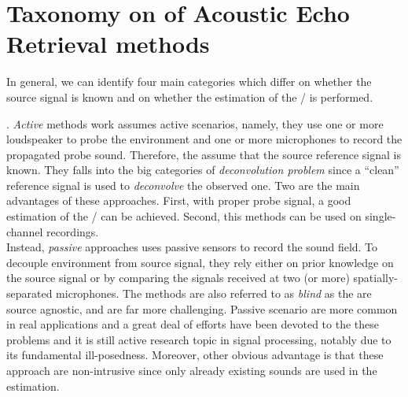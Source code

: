 \section{Taxonomy on of Acoustic Echo Retrieval methods}\label{sec:estimation:taxonomy}

In general, we can identify four main categories which differ on whether the source signal is known and on whether the estimation of the \RIR/ is performed.

.
\textit{Active} methods work assumes active scenarios, namely, they use one or more loudspeaker to probe the environment and one or more microphones to record the propagated probe sound.
Therefore, the assume that the source reference signal is known.
They falls into the big categories of \textit{deconvolution problem} since a ``clean'' reference signal is used to \textit{deconvolve} the observed one.
Two are the main advantages of these approaches.
First, with proper probe signal, a good estimation of the \RIR/ can be achieved.
Second, this methods can be used on single-channel recordings.
\\Instead, \textit{passive} approaches uses passive sensors to record the sound field.
To decouple environment from source signal, they rely either on prior knowledge on the source signal or by comparing the signals received at two (or more) spatially-separated microphones.
The methods are also referred to as \textit{blind} as the are source agnostic, and are far more challenging.
Passive scenario are more common in real applications and a great deal of efforts have been devoted to the these problems and it is still active research topic in signal processing, notably due to its fundamental ill-posedness.
Moreover, other obvious advantage is that these approach are non-intrusive since only already existing sounds are used in the estimation.

\begin{figure}[h]
    \footnotesize
    \resizebox{\linewidth}{!}{
        
    }
    \vspace{-\baselineskip}\vspace{-\baselineskip}
\end{figure}

